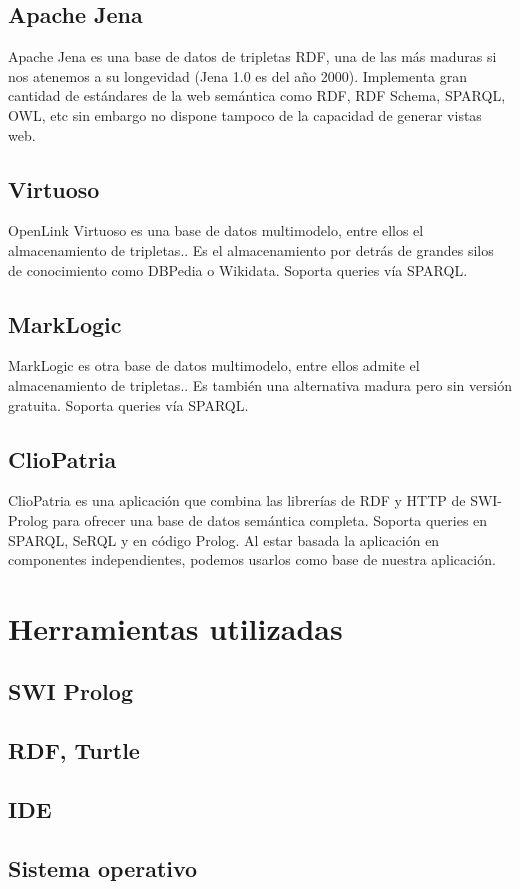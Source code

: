 \documentclass[12pt]{report} %
\begin{document}
\section{Apache Jena}
Apache Jena es una base de datos de tripletas RDF, una de las más maduras si nos atenemos a su longevidad (Jena 1.0 es del año 2000).\cite{couchdb}
Implementa gran cantidad de estándares de la web semántica como RDF, RDF Schema, SPARQL, OWL, etc sin embargo no dispone tampoco de la capacidad de generar vistas web.

\section{Virtuoso}
OpenLink Virtuoso es una base de datos multimodelo, entre ellos el almacenamiento de tripletas.\cite{virtuoso}.
Es el almacenamiento por detrás de grandes silos de conocimiento como DBPedia o Wikidata. Soporta queries vía SPARQL.

\section{MarkLogic}
MarkLogic es otra base de datos multimodelo, entre ellos admite el almacenamiento de tripletas.\cite{marklogic}.
Es también una alternativa madura pero sin versión gratuita. Soporta queries vía SPARQL.

\section{ClioPatria}
ClioPatria es una aplicación que combina las librerías de RDF y HTTP de SWI-Prolog para ofrecer una base de datos semántica completa.\cite{cliopatria}
Soporta queries en SPARQL, SeRQL y en código Prolog. Al estar basada la aplicación en componentes independientes, podemos usarlos como base
de nuestra aplicación.

\chapter{Herramientas utilizadas}

\section{SWI Prolog}

\section{RDF, Turtle}

\section{IDE}

\section{Sistema operativo}





\end{document}
